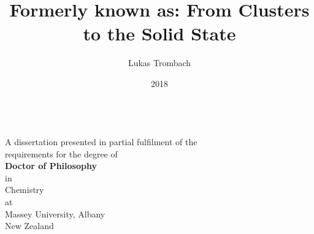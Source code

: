 
\author{Lukas Trombach}
\title{Formerly known as: From Clusters to the Solid State}
\date{2018}

\makeatletter
\begin{titlepage}
\begin{center}
\vspace*{10mm}
    \LARGE{\textbf{\@title
    }}\\\vspace{2cm}
    \large{
    A dissertation presented in partial fulfilment of the \\ requirements for the degree of 
    }\\\vspace{2cm}
    \large{\textbf{
    Doctor of Philosophy
    }}\\
	\large{in \\ Chemistry}\\\vspace{2cm}
    \large{at \\ Massey University, Albany \\ New Zealand}\\\vspace{2cm}
    \large{\textbf{\@author}}\\\vspace{1.5cm}
    \large{\@date}
    
\end{center}
\end{titlepage}
